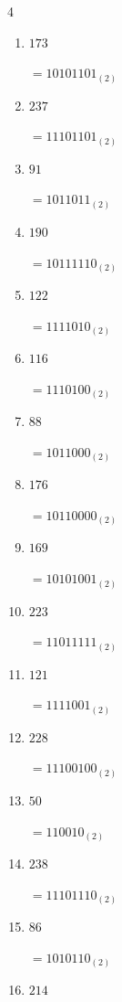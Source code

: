 \begin{multicols}{4}
\begin{enumerate}
        $=101011_{(2)}$

  \item $173$

        $=10101101_{(2)}$

  \item $237$

        $=11101101_{(2)}$

  \item $91$

        $=1011011_{(2)}$

\columnbreak %

  \item $190$

        $=10111110_{(2)}$

  \item $122$

        $=1111010_{(2)}$

  \item $116$

        $=1110100_{(2)}$

  \item $88$

        $=1011000_{(2)}$

  \item $176$

        $=10110000_{(2)}$

  \item $169$

        $=10101001_{(2)}$

  \item $223$

        $=11011111_{(2)}$

  \item $121$

        $=1111001_{(2)}$

  \item $228$

        $=11100100_{(2)}$

  \item $50$

        $=110010_{(2)}$

  \item $238$

        $=11101110_{(2)}$

  \item $86$

        $=1010110_{(2)}$

  \item $214$


\end{enumerate}
\end{multicols}
